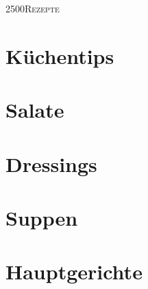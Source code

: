 \documentclass[9pt, a4paper, twoside]{book} %
\makeatletter
\newcommand\GRAANDE{\@setfontsize\Huge{250}{0}}
\makeatother
\begin{document}
\renewcommand{\indexname}{S\-t\-i\-c\-h\-w\-o\-r\-t\-v\-e\-r\-z\-e\-i\-c\-h\-n\-i\-s}

\justify
\setlength\parindent{0pt}

\thispagestyle{empty}
\vspace*{3cm}
\begin{center}
{\GRAANDE{\textsc{R\-e\-z\-e\-p\-t\-e}}}
\vspace{2cm}
\end{center}
\vspace{3cm}
\newpage

\tableofcontents

\cleardoublepage
\printindex

\cleardoublepage
{}

\chapter{K\-ü\-c\-h\-e\-n\-t\-i\-p\-s}
\thispagestyle{empty}
\newpage

\chapter{S\-a\-l\-a\-t\-e}
\thispagestyle{empty}
\newpage






\chapter{D\-r\-e\-s\-s\-i\-n\-g\-s}
\thispagestyle{empty}
\newpage




\chapter{S\-u\-p\-p\-e\-n}
\thispagestyle{empty}
\newpage


\newpage




\chapter{H\-a\-u\-p\-t\-g\-e\-r\-i\-c\-h\-t\-e}
\thispagestyle{empty}
\newpage


\newpage


\newpage

\newpage

\newpage





\newpage


\end{document}
